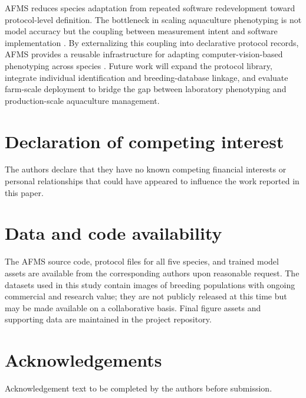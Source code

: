 \documentclass[final,3p,times]{elsarticle}
\begin{document}
AFMS reduces species adaptation from repeated software redevelopment toward protocol-level definition. The bottleneck in scaling aquaculture phenotyping is not model accuracy but the coupling between measurement intent and software implementation \citep{gonzalez2023phytooracle}. By externalizing this coupling into declarative protocol records, AFMS provides a reusable infrastructure for adapting computer-vision-based phenotyping across species \citep{liu2024fishphenokey}. Future work will expand the protocol library, integrate individual identification \citep{zhang2026fishfaceid} and breeding-database linkage, and evaluate farm-scale deployment to bridge the gap between laboratory phenotyping and production-scale aquaculture management.

\section*{Declaration of competing interest}

The authors declare that they have no known competing financial interests or personal relationships that could have appeared to influence the work reported in this paper.

\section*{Data and code availability}

The AFMS source code, protocol files for all five species, and trained model assets are available from the corresponding authors upon reasonable request. The datasets used in this study contain images of breeding populations with ongoing commercial and research value; they are not publicly released at this time but may be made available on a collaborative basis. Final figure assets and supporting data are maintained in the project repository.

\section*{Acknowledgements}

Acknowledgement text to be completed by the authors before submission.



\end{document}
